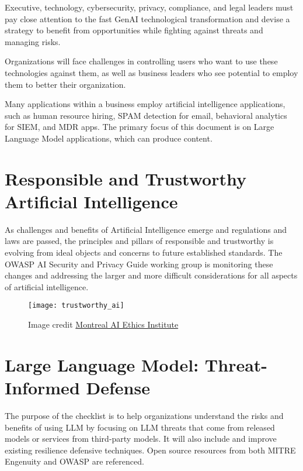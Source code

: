 Executive, technology, cybersecurity, privacy, compliance, and legal leaders
must pay close attention to the fast GenAI technological transformation and
devise a strategy to benefit from opportunities while fighting against threats
and managing risks.

Organizations will face challenges in controlling users who want to use these
technologies against them, as well as business leaders who see potential to
employ them to better their organization.

Many applications within a business employ artificial intelligence
applications, such as human resource hiring, SPAM detection for email,
behavioral analytics for SIEM, and MDR apps. The primary focus of this document
is on Large Language Model applications, which can produce content.

\clearpage

\section{Responsible and Trustworthy Artificial Intelligence}

As challenges and benefits of Artificial Intelligence emerge and regulations and
laws are passed, the principles and pillars of responsible and trustworthy is
evolving from ideal objects and concerns to future established standards. The
OWASP AI Security and Privacy Guide working group is monitoring these changes
and addressing the larger and more difficult considerations for all aspects of
artificial intelligence.

\begin{figure}[h]
  \centering
  \texttt{[image: trustworthy\_ai]}
  \caption{Image credit \href{https://montrealethics.ai/}{Montreal AI Ethics Institute}}
  \label{fig:trustworthy-ai}
\end{figure}

\section{Large Language Model: Threat-Informed Defense}

The purpose of the checklist is to help organizations understand the risks and
benefits of using LLM by focusing on LLM threats that come from released models
or services from third-party models. It will also include and improve existing
resilience defensive techniques. Open source resources from both MITRE Engenuity
and OWASP are referenced.


